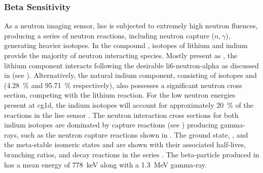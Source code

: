 \documentclass[../../../main.tex]{subfiles}%
\begin{document}
%
    \Xsubsection%
    \subsubsection*{Beta Sensitivity}%
    \label{sec:chapter-4:semiconductor-response:beta}%
    As a neutron imaging sensor, \gls{lise} is subjected to extremely high neutron fluences, producing a series of neutron reactions, including  neutron capture ($n,\gamma$), generating heavier isotopes.
    In the compound , isotopes of lithium and indium provide the majority of neutron interacting species.
    Mostly present as , the lithium component interacts following the desirable \gls{li6-neutron-alpha} as discussed in  (see ).
    Alternatively, the natural indium component, consisting of isotopes  and  (\SI{4.28}{\percent} and \SI{95.71}{\percent} respectively), also possesses a significant neutron cross section, competing with the lithium reaction.
    For the low neutron energies present at \gls{cg1d}, the indium isotopes will account for approximately \SI{20}{\percent} of the reactions in the \gls{lise} sensor \cite{Lukosi_2016a}.
    The neutron interaction cross sections for both indium isotopes are dominated by capture reactions (see ) producing \glspl{gamma-ray}, such as the  neutron capture reactions shown in .
    The ground state, , and the meta-stable isomeric states  and  are shown with their associated half-lives, branching ratios, and decay reactions in the  series \cite{Blachot_2012}. 
    The \gls{beta-particle} produced in  has a mean energy of \SI{778}{\kilo\electronvolt} along with a \SI{1.3}{\mega\electronvolt} \gls{gamma-ray}.
\end{document}
